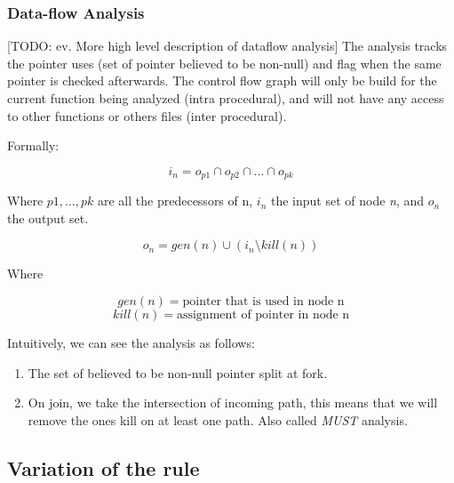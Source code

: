 \subsubsection{Data-flow Analysis}
\label{subsubsec:data_flow_analysis}

[TODO: ev. More high level description of dataflow analysis]
The analysis tracks the pointer uses (set of pointer believed to be non-null) and flag when the same pointer is checked afterwards. 
The control flow graph will only be build for the current function being analyzed (intra procedural), and will not have any access to other functions or others files (inter procedural).

Formally:

\begin{equation}\label{eqn:dataflow1}
i_{n} = o_{p1}  \cap   o_{p2}  \cap  ... \cap   o_{pk}
\end{equation}

Where $p1, ..., pk$ are all the predecessors of n, $i_{n}$ the input set of node \emph{n}, and  $o_{n}$ the output set.

\begin{equation}\label{eqn:dataflow2}
o_{n} = gen(n)  \cup   (i_{n} \setminus kill(n))
\end{equation}

Where

\begin{equation}\label{eqn:dataflow3}
gen(n) =\text{pointer that is used in node n}
\end{equation}
\begin{equation}\label{eqn:dataflow4}
kill(n) = \text{assignment of pointer in node n}
\end{equation}

Intuitively, we can see the analysis as follows:
\begin{enumerate}
	\item The set of believed to be non-null pointer split at fork. \newline 
	\item On join, we take the intersection of incoming path, this means that we will remove the ones kill on at least one path. Also called \emph{MUST} analysis. \newline 
\end{enumerate}

\subsection{Variation of the rule}
\label{subsec:rule_variation}

